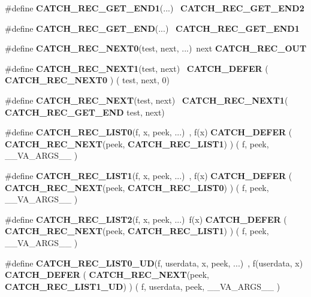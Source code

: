\begin{DoxyCompactItemize}
\item 
\#define \textbf{ C\+A\+T\+C\+H\+\_\+\+R\+E\+C\+\_\+\+G\+E\+T\+\_\+\+E\+N\+D1}(...)~\textbf{ C\+A\+T\+C\+H\+\_\+\+R\+E\+C\+\_\+\+G\+E\+T\+\_\+\+E\+N\+D2}
\item 
\#define \textbf{ C\+A\+T\+C\+H\+\_\+\+R\+E\+C\+\_\+\+G\+E\+T\+\_\+\+E\+ND}(...)~\textbf{ C\+A\+T\+C\+H\+\_\+\+R\+E\+C\+\_\+\+G\+E\+T\+\_\+\+E\+N\+D1}
\item 
\#define \textbf{ C\+A\+T\+C\+H\+\_\+\+R\+E\+C\+\_\+\+N\+E\+X\+T0}(test,  next, ...)~next \textbf{ C\+A\+T\+C\+H\+\_\+\+R\+E\+C\+\_\+\+O\+UT}
\item 
\#define \textbf{ C\+A\+T\+C\+H\+\_\+\+R\+E\+C\+\_\+\+N\+E\+X\+T1}(test,  next)~\textbf{ C\+A\+T\+C\+H\+\_\+\+D\+E\+F\+ER} ( \textbf{ C\+A\+T\+C\+H\+\_\+\+R\+E\+C\+\_\+\+N\+E\+X\+T0} ) ( test, next, 0)
\item 
\#define \textbf{ C\+A\+T\+C\+H\+\_\+\+R\+E\+C\+\_\+\+N\+E\+XT}(test,  next)~\textbf{ C\+A\+T\+C\+H\+\_\+\+R\+E\+C\+\_\+\+N\+E\+X\+T1}(\textbf{ C\+A\+T\+C\+H\+\_\+\+R\+E\+C\+\_\+\+G\+E\+T\+\_\+\+E\+ND} test, next)
\item 
\#define \textbf{ C\+A\+T\+C\+H\+\_\+\+R\+E\+C\+\_\+\+L\+I\+S\+T0}(f,  x,  peek, ...)~, f(x) \textbf{ C\+A\+T\+C\+H\+\_\+\+D\+E\+F\+ER} ( \textbf{ C\+A\+T\+C\+H\+\_\+\+R\+E\+C\+\_\+\+N\+E\+XT}(peek, \textbf{ C\+A\+T\+C\+H\+\_\+\+R\+E\+C\+\_\+\+L\+I\+S\+T1}) ) ( f, peek, \+\_\+\+\_\+\+V\+A\+\_\+\+A\+R\+G\+S\+\_\+\+\_\+ )
\item 
\#define \textbf{ C\+A\+T\+C\+H\+\_\+\+R\+E\+C\+\_\+\+L\+I\+S\+T1}(f,  x,  peek, ...)~, f(x) \textbf{ C\+A\+T\+C\+H\+\_\+\+D\+E\+F\+ER} ( \textbf{ C\+A\+T\+C\+H\+\_\+\+R\+E\+C\+\_\+\+N\+E\+XT}(peek, \textbf{ C\+A\+T\+C\+H\+\_\+\+R\+E\+C\+\_\+\+L\+I\+S\+T0}) ) ( f, peek, \+\_\+\+\_\+\+V\+A\+\_\+\+A\+R\+G\+S\+\_\+\+\_\+ )
\item 
\#define \textbf{ C\+A\+T\+C\+H\+\_\+\+R\+E\+C\+\_\+\+L\+I\+S\+T2}(f,  x,  peek, ...)~f(x) \textbf{ C\+A\+T\+C\+H\+\_\+\+D\+E\+F\+ER} ( \textbf{ C\+A\+T\+C\+H\+\_\+\+R\+E\+C\+\_\+\+N\+E\+XT}(peek, \textbf{ C\+A\+T\+C\+H\+\_\+\+R\+E\+C\+\_\+\+L\+I\+S\+T1}) ) ( f, peek, \+\_\+\+\_\+\+V\+A\+\_\+\+A\+R\+G\+S\+\_\+\+\_\+ )
\item 
\#define \textbf{ C\+A\+T\+C\+H\+\_\+\+R\+E\+C\+\_\+\+L\+I\+S\+T0\+\_\+\+UD}(f,  userdata,  x,  peek, ...)~, f(userdata, x) \textbf{ C\+A\+T\+C\+H\+\_\+\+D\+E\+F\+ER} ( \textbf{ C\+A\+T\+C\+H\+\_\+\+R\+E\+C\+\_\+\+N\+E\+XT}(peek, \textbf{ C\+A\+T\+C\+H\+\_\+\+R\+E\+C\+\_\+\+L\+I\+S\+T1\+\_\+\+UD}) ) ( f, userdata, peek, \+\_\+\+\_\+\+V\+A\+\_\+\+A\+R\+G\+S\+\_\+\+\_\+ )

\end{DoxyCompactItemize}
